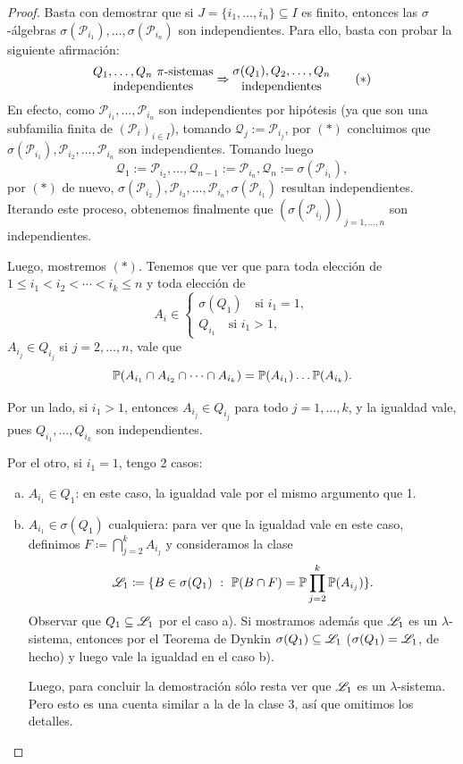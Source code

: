 \begin{proof}
	Basta con demostrar que si $J=\{i_1,\dots,i_n\}\subseteq I$ es finito, entonces las $\sigma$-álgebras $\sigma(\mathcal{P}_{i_1}),\dots,\sigma(\mathcal{P}_{i_n})$ son independientes. Para ello, basta con probar la siguiente afirmación:
	\[
	\stackanchor{$Q_{1},\dots,Q_{n}\ \pi \text{-sistemas}$}{\text{independientes}} \implies \stackanchor{$\sigma(Q_{1}), Q_{2}, \dots, Q_{n}$}{\text{independientes}} \tag{$*$}
	\]
	En efecto, como $\mathcal{P}_{i_1},\dots,\mathcal{P}_{i_n}$ son independientes por hipótesis (ya que son una subfamilia finita de $(\mathcal{P}_i)_{i\in I}$), tomando $\mathcal{Q}_{j} := \mathcal{P}_{i_{j}}$, por $(*)$ concluimos que $\sigma(\mathcal{P}_{i_1}), \mathcal{P}_{i_2},\dots,\mathcal{P}_{i_n}$ son independientes. Tomando luego 
	\[
	\mathcal{Q}_1 := \mathcal{P}_{i_2},\dots,\mathcal{Q}_{n-1} := \mathcal{P}_{i_n}, \mathcal{Q}_n := \sigma(\mathcal{P}_{i_1}),
	\]
	por $(*)$ de nuevo, $\sigma(\mathcal{P}_{i_2}), \mathcal{P}_{i_3},\dots,\mathcal{P}_{i_n}, \sigma(\mathcal{P}_{i_1})$ resultan independientes. Iterando este proceso, obtenemos finalmente que $(\sigma(\mathcal{P}_{i_j}))_{j=1,\dots,n}$ son independientes. \par
	Luego, mostremos $(*)$. Tenemos que ver que para toda elección de $1 \leq i_{1} < i_{2} < \cdots < i_{k} \leq n$ y toda elección de
	\[ A_{i} \in \begin{cases}
		\sigma(Q_{1}) \quad \text{si } i_{1} = 1, \\
		Q_{i_{1}} \quad \text{si } i_{1} > 1,
	\end{cases} \]
	$A_{i_{j}} \in Q_{i_{j}}$ si $j = 2, \dots, n$, vale que
	\[ \mathbb{P}(A_{i_{1}} \cap A_{i_{2}} \cap \cdots \cap A_{i_{k}}) = \mathbb{P}(A_{i_{1}}) \dots \mathbb{P}(A_{i_{k}}). \]
	\par Por un lado, si $i_{1} > 1$, entonces $A_{i_{j}} \in Q_{i_{j}}$ para todo $j = 1, \dots, k$, y la igualdad vale, pues $Q_{i_{1}},\dots,Q_{i_{k}}$ son independientes. \par
	Por el otro, si $i_{1} = 1$, tengo 2 casos:
	\begin{enumerate}[a)]
		\item $A_{i_{1}} \in Q_{1}$: en este caso, la igualdad vale por el mismo argumento que 1.

		\item $A_{i_{1}} \in \sigma(Q_{1})$ cualquiera: para ver que la igualdad vale en este caso, definimos $F \coloneq \bigcap_{j=2}^{k} A_{i_{j}}$ y consideramos la clase
		\[ \mathscr{L}_{1} \coloneq \{B \in \sigma(Q_{1}) \ : \ \mathbb{P}(B \cap F) = \mathbb{P} \prod_{j=2}^{k} \mathbb{P}(A_{i_{j}}) \}. \] 
		Observar que $Q_{1} \subseteq \mathscr{L}_{1}$ por el caso a). Si mostramos además que $\mathscr{L}_{1}$ es un $\lambda$-sistema, entonces por el Teorema de Dynkin $\sigma(Q_{1}) \subseteq \mathscr{L}_{1}$ ($\sigma(Q_{1}) = \mathscr{L}_{1}$, de hecho) y luego vale la igualdad en el caso b). \par
		Luego, para concluir la demostración sólo resta ver que $\mathscr{L}_{1}$ es un $\lambda$-sistema. Pero esto es una cuenta similar a la de la clase 3, así que omitimos los detalles.
	\end{enumerate}
\end{proof}

